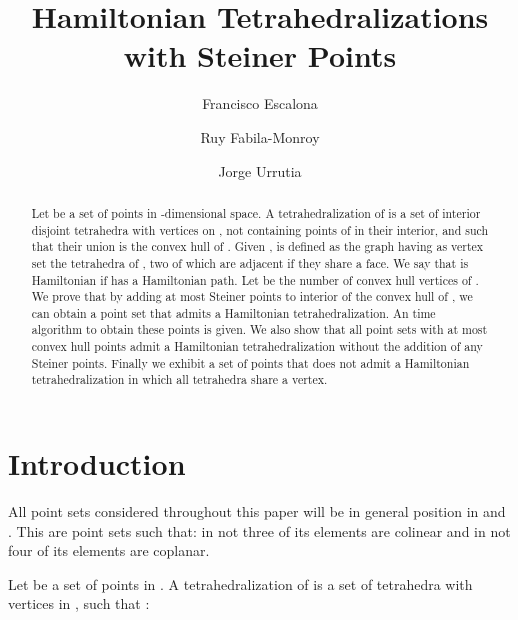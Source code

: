 \documentclass{article}
\title{Hamiltonian Tetrahedralizations with Steiner Points}
\author{
Francisco Escalona\footnotemark[1] \and
Ruy Fabila-Monroy\footnotemark[2] \and
Jorge Urrutia  \footnotemark[2]
}
\begin{document}
\maketitle

\begin{abstract}

Let  be a set of  points in -dimensional 
space. A tetrahedralization 
 of  is a set of interior 
disjoint tetrahedra with vertices on , 
not containing points of  in their interior, 
and such that their union is the convex hull of .
Given ,  is
defined as the graph having as vertex set
the tetrahedra of , two of which are adjacent
if they share a face. We say that  
is Hamiltonian if   has
a  Hamiltonian path. Let  be the number
of convex hull vertices of .
We prove that by adding
at most  
Steiner points to interior of the convex hull of , 
we can obtain a point
set that admits a Hamiltonian tetrahedralization.
An   time
algorithm to obtain these points is given.
We also show that all point sets with at most 
convex hull points admit a Hamiltonian tetrahedralization
without the addition of any Steiner points.
Finally we exhibit a set of  points that does not
admit a Hamiltonian tetrahedralization in which all
tetrahedra share a vertex.
\end{abstract}




\renewcommand{\thefootnote}{\fnsymbol{footnote}}


\renewcommand{\thefootnote}{\arabic{footnote}}

\section{Introduction}

All point sets considered throughout this paper will be in general position
in  and .
This are point sets such that: in  not three
of its elements are colinear and in  not
four of its elements are coplanar.\par

Let  be a set of  points in . 
A tetrahedralization  of  is a set 
of tetrahedra with vertices in , such that :
\end{document}
